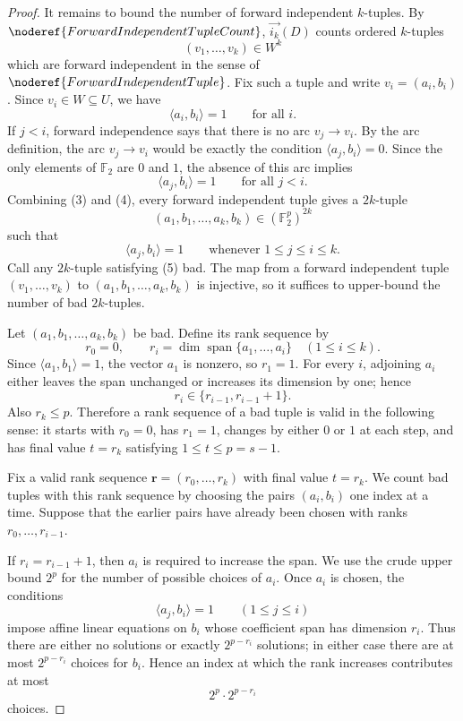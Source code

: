 \begin{proof}
It remains to bound the number of forward independent \(k\)-tuples. By \(\noderef{ForwardIndependentTupleCount}\), \(\overrightarrow{i_k}(D)\) counts ordered \(k\)-tuples
\[
  (v_1,\ldots,v_k)\in W^k
\]
which are forward independent in the sense of \(\noderef{ForwardIndependentTuple}\). Fix such a tuple and write \(v_i=(a_i,b_i)\). Since \(v_i\in W\subseteq U\), we have
\[
  \langle a_i,b_i\rangle=1 \qquad\text{for all } i. \tag{3}
\]
If \(j<i\), forward independence says that there is no arc \(v_j\to v_i\). By the arc definition, the arc \(v_j\to v_i\) would be exactly the condition \(\langle a_j,b_i\rangle=0\). Since the only elements of \(\mathbb F_2\) are \(0\) and \(1\), the absence of this arc implies
\[
  \langle a_j,b_i\rangle=1 \qquad\text{for all } j<i. \tag{4}
\]
Combining (3) and (4), every forward independent tuple gives a \(2k\)-tuple
\[
  (a_1,b_1,\ldots,a_k,b_k)\in(\mathbb F_2^p)^{2k}
\]
such that
\[
  \langle a_j,b_i\rangle=1
  \qquad\text{whenever }1\le j\le i\le k. \tag{5}
\]
Call any \(2k\)-tuple satisfying (5) bad. The map from a forward independent tuple \((v_1,\ldots,v_k)\) to \((a_1,b_1,\ldots,a_k,b_k)\) is injective, so it suffices to upper-bound the number of bad \(2k\)-tuples.

Let \((a_1,b_1,\ldots,a_k,b_k)\) be bad. Define its rank sequence by
\[
  r_0=0,\qquad
  r_i=\dim\operatorname{span}\{a_1,\ldots,a_i\}
  \quad(1\le i\le k).
\]
Since \(\langle a_1,b_1\rangle=1\), the vector \(a_1\) is nonzero, so \(r_1=1\). For every \(i\), adjoining \(a_i\) either leaves the span unchanged or increases its dimension by one; hence
\[
  r_i\in\{r_{i-1},r_{i-1}+1\}.
\]
Also \(r_k\le p\). Therefore a rank sequence of a bad tuple is valid in the following sense: it starts with \(r_0=0\), has \(r_1=1\), changes by either \(0\) or \(1\) at each step, and has final value \(t=r_k\) satisfying \(1\le t\le p=s-1\).

Fix a valid rank sequence \(\mathbf r=(r_0,\ldots,r_k)\) with final value \(t=r_k\). We count bad tuples with this rank sequence by choosing the pairs \((a_i,b_i)\) one index at a time. Suppose that the earlier pairs have already been chosen with ranks \(r_0,\ldots,r_{i-1}\).

If \(r_i=r_{i-1}+1\), then \(a_i\) is required to increase the span. We use the crude upper bound \(2^p\) for the number of possible choices of \(a_i\). Once \(a_i\) is chosen, the conditions
\[
  \langle a_j,b_i\rangle=1\qquad(1\le j\le i)
\]
impose affine linear equations on \(b_i\) whose coefficient span has dimension \(r_i\). Thus there are either no solutions or exactly \(2^{p-r_i}\) solutions; in either case there are at most \(2^{p-r_i}\) choices for \(b_i\). Hence an index at which the rank increases contributes at most
\[
  2^p\cdot 2^{p-r_i}
\]
choices.


\end{proof}
